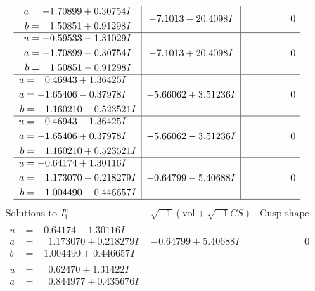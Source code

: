 \documentclass[1p]{elsarticle_modified}
\theoremstyle{definition}
\newcommand{\I}{\sqrt{-1}}
\begin{document}
$$\begin{array}{c|c|c}
\begin{aligned}
a &= -1.70899 + 0.30754 I \\
b &= \phantom{-}1.50851 + 0.91298 I\end{aligned}
 & -7.1013 - 20.4098 I & \phantom{-0.000000 } 0 \\ \hline\begin{aligned}
u &= -0.59533 - 1.31029 I \\
a &= -1.70899 - 0.30754 I \\
b &= \phantom{-}1.50851 - 0.91298 I\end{aligned}
 & -7.1013 + 20.4098 I & \phantom{-0.000000 } 0 \\ \hline\begin{aligned}
u &= \phantom{-}0.46943 + 1.36425 I \\
a &= -1.65406 - 0.37978 I \\
b &= \phantom{-}1.160210 - 0.523521 I\end{aligned}
 & -5.66062 + 3.51236 I & \phantom{-0.000000 } 0 \\ \hline\begin{aligned}
u &= \phantom{-}0.46943 - 1.36425 I \\
a &= -1.65406 + 0.37978 I \\
b &= \phantom{-}1.160210 + 0.523521 I\end{aligned}
 & -5.66062 - 3.51236 I & \phantom{-0.000000 } 0 \\ \hline\begin{aligned}
u &= -0.64174 + 1.30116 I \\
a &= \phantom{-}1.173070 - 0.218279 I \\
b &= -1.004490 - 0.446657 I\end{aligned}
 & -0.64799 - 5.40688 I & \phantom{-0.000000 } 0\\
 \hline 
 \end{array}$$\newpage$$\begin{array}{c|c|c}  
\text{Solutions to }I^u_{1}& \I (\text{vol} + \sqrt{-1}CS) & \text{Cusp shape}\\
 \hline 
\begin{aligned}
u &= -0.64174 - 1.30116 I \\
a &= \phantom{-}1.173070 + 0.218279 I \\
b &= -1.004490 + 0.446657 I\end{aligned}
 & -0.64799 + 5.40688 I & \phantom{-0.000000 } 0 \\ \hline\begin{aligned}
u &= \phantom{-}0.62470 + 1.31422 I \\
a &= \phantom{-}0.844977 + 0.435676 I \\

\end{aligned}
\end{array}$$
\end{document}
